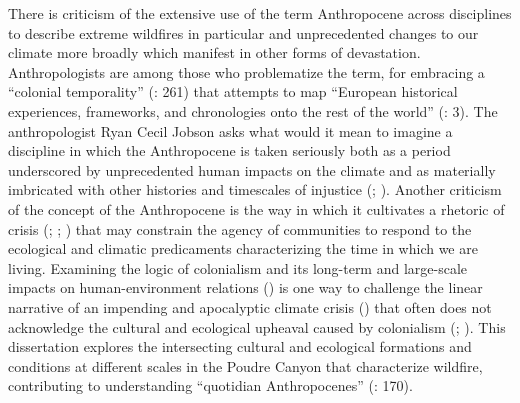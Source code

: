 \documentclass[
]{article}
\begin{document}
There is criticism of the extensive use of the term Anthropocene across disciplines to describe extreme wildfires in particular and unprecedented changes to our climate more broadly which manifest in other forms of devastation. Anthropologists are among those who problematize the term, for embracing a ``colonial temporality'' (: 261) that attempts to map ``European historical experiences, frameworks, and chronologies onto the rest of the world'' (: 3). The anthropologist Ryan Cecil Jobson asks what would it mean to imagine a discipline in which the Anthropocene is taken seriously both as a period underscored by unprecedented human impacts on the climate and as materially imbricated with other histories and timescales of injustice (; ). Another criticism of the concept of the Anthropocene is the way in which it cultivates a rhetoric of crisis (; ; ) that may constrain the agency of communities to respond to the ecological and climatic predicaments characterizing the time in which we are living. Examining the logic of colonialism and its long-term and large-scale impacts on human-environment relations () is one way to challenge the linear narrative of an impending and apocalyptic climate crisis () that often does not acknowledge the cultural and ecological upheaval caused by colonialism (; ). This dissertation explores the intersecting cultural and ecological formations and conditions at different scales in the Poudre Canyon that characterize wildfire, contributing to understanding ``quotidian Anthropocenes'' (: 170).
\end{document}
